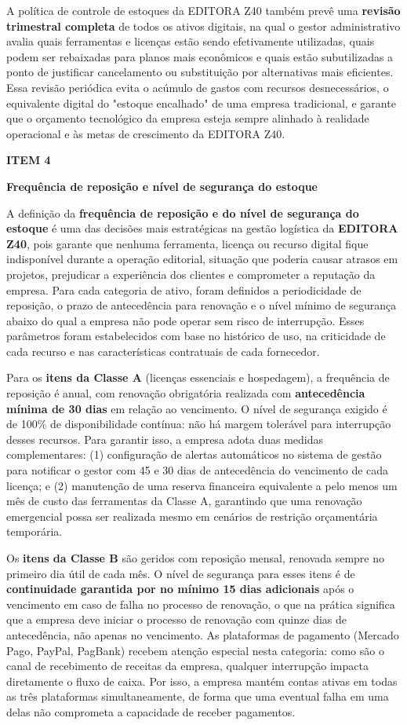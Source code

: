 \documentclass[10pt,a4paper]{article}
\newcommand{\labelfont}{\fontsize{5.8}{7.5}\selectfont\bfseries\addfontfeatures{LetterSpace=15}}
\newcommand{\headingfont}{\fontsize{9.8}{12}\selectfont\bfseries\color{navy}}
\newcommand{\separador}{\vspace{16pt}{\color{rulegray}\rule{\linewidth}{0.6pt}}\vspace{10pt}}
\newcommand{\itemh}[2]{\needspace{6\baselineskip}%
  {\labelfont\color{graylab}ITEM #1}\par\vspace{5pt}%
  {\headingfont #2}\par\vspace{8pt}}
\begin{document}
A política de controle de estoques da EDITORA Z40 também prevê uma \textbf{revisão trimestral completa} de todos os ativos digitais, na qual o gestor administrativo avalia quais ferramentas e licenças estão sendo efetivamente utilizadas, quais podem ser rebaixadas para planos mais econômicos e quais estão subutilizadas a ponto de justificar cancelamento ou substituição por alternativas mais eficientes. Essa revisão periódica evita o acúmulo de gastos com recursos desnecessários, o equivalente digital do "estoque encalhado" de uma empresa tradicional, e garante que o orçamento tecnológico da empresa esteja sempre alinhado à realidade operacional e às metas de crescimento da EDITORA Z40.

\separador
\itemh{4}{Frequência de reposição e nível de segurança do estoque}

A definição da \textbf{frequência de reposição e do nível de segurança do estoque} é uma das decisões mais estratégicas na gestão logística da \textbf{EDITORA Z40}, pois garante que nenhuma ferramenta, licença ou recurso digital fique indisponível durante a operação editorial, situação que poderia causar atrasos em projetos, prejudicar a experiência dos clientes e comprometer a reputação da empresa. Para cada categoria de ativo, foram definidos a periodicidade de reposição, o prazo de antecedência para renovação e o nível mínimo de segurança abaixo do qual a empresa não pode operar sem risco de interrupção. Esses parâmetros foram estabelecidos com base no histórico de uso, na criticidade de cada recurso e nas características contratuais de cada fornecedor.

Para os \textbf{itens da Classe A} (licenças essenciais e hospedagem), a frequência de reposição é anual, com renovação obrigatória realizada com \textbf{antecedência mínima de 30 dias} em relação ao vencimento. O nível de segurança exigido é de 100\% de disponibilidade contínua: não há margem tolerável para interrupção desses recursos. Para garantir isso, a empresa adota duas medidas complementares: (1) configuração de alertas automáticos no sistema de gestão para notificar o gestor com 45 e 30 dias de antecedência do vencimento de cada licença; e (2) manutenção de uma reserva financeira equivalente a pelo menos um mês de custo das ferramentas da Classe A, garantindo que uma renovação emergencial possa ser realizada mesmo em cenários de restrição orçamentária temporária.

Os \textbf{itens da Classe B} são geridos com reposição mensal, renovada sempre no primeiro dia útil de cada mês. O nível de segurança para esses itens é de \textbf{continuidade garantida por no mínimo 15 dias adicionais} após o vencimento em caso de falha no processo de renovação, o que na prática significa que a empresa deve iniciar o processo de renovação com quinze dias de antecedência, não apenas no vencimento. As plataformas de pagamento (Mercado Pago, PayPal, PagBank) recebem atenção especial nesta categoria: como são o canal de recebimento de receitas da empresa, qualquer interrupção impacta diretamente o fluxo de caixa. Por isso, a empresa mantém contas ativas em todas as três plataformas simultaneamente, de forma que uma eventual falha em uma delas não comprometa a capacidade de receber pagamentos.
\end{document}
